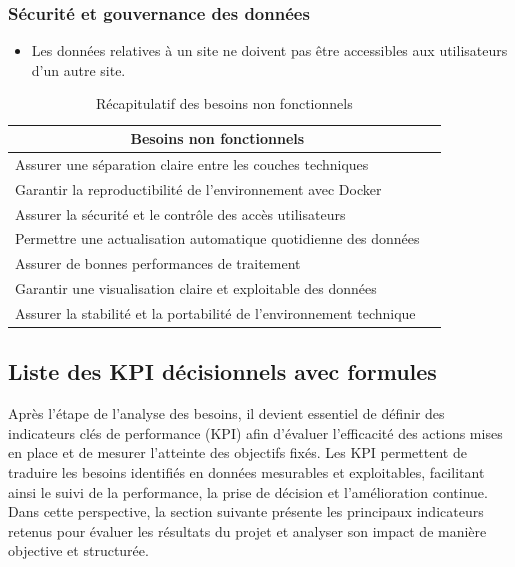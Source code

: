 \subsubsection{Sécurité et gouvernance des données}
\begin{itemize}
    \item Les données relatives à un site ne doivent pas être accessibles aux utilisateurs d'un autre site.
\end{itemize}
\begin{table}[H]
\centering
\caption{Récapitulatif des besoins non fonctionnels}
\renewcommand{\arraystretch}{1.1}

\begin{tabular}{|p{12cm}|p{7cm}|}
\hline

\multicolumn{1}{|c|}{\textbf{Besoins non fonctionnels}} \\
\hline

Assurer une séparation claire entre les couches techniques \\
\hline

Garantir la reproductibilité de l’environnement avec Docker \\
\hline

 Assurer la sécurité et le contrôle des accès utilisateurs \\
\hline

Permettre une actualisation automatique quotidienne des données \\
\hline

Assurer de bonnes performances de traitement \\
\hline

Garantir une visualisation claire et exploitable des données \\
\hline

Assurer la stabilité et la portabilité de l’environnement technique \\
\hline

\hline

\end{tabular}
\end{table}
\subsection{Liste des KPI décisionnels avec formules}
Après l’étape de l’analyse des besoins, il devient essentiel de définir des indicateurs clés de performance (KPI) afin d’évaluer l’efficacité des actions mises en place et de mesurer l’atteinte des objectifs fixés. Les KPI permettent de traduire les besoins identifiés en données mesurables et exploitables, facilitant ainsi le suivi de la performance, la prise de décision et l’amélioration continue. Dans cette perspective, la section suivante présente les principaux indicateurs retenus pour évaluer les résultats du projet et analyser son impact de manière objective et structurée.

